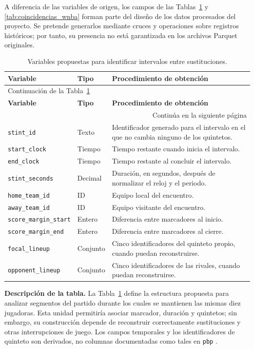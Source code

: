 A diferencia de las variables de origen, los campos de las Tablas~\ref{tab:stints_wnba} y \ref{tab:coincidencias_wnba} forman parte del diseño de los datos procesados del proyecto. Se pretende generarlos mediante cruces y operaciones sobre registros históricos; por tanto, su presencia no está garantizada en los archivos Parquet originales.

{\small
\renewcommand{\arraystretch}{1.15}
\begin{longtable}{@{}p{3.8cm}p{1.7cm}p{6.9cm}@{}}
\caption{Variables propuestas para identificar intervalos entre sustituciones.}\label{tab:stints_wnba}\\
\toprule \textbf{Variable} & \textbf{Tipo} & \textbf{Procedimiento de obtención}\\\midrule\endfirsthead
\multicolumn{3}{l}{\small Continuación de la Tabla~\ref{tab:stints_wnba}}\\
\toprule\textbf{Variable}&\textbf{Tipo}&\textbf{Procedimiento de obtención}\\\midrule\endhead
\midrule\multicolumn{3}{r}{\small Continúa en la siguiente página}\\\endfoot
\bottomrule\endlastfoot
\texttt{stint\_id}&Texto&Identificador generado para el intervalo en el que no cambia ninguno de los quintetos.\\
\texttt{start\_clock}&Tiempo&Tiempo restante cuando inicia el intervalo.\\
\texttt{end\_clock}&Tiempo&Tiempo restante al concluir el intervalo.\\
\texttt{stint\_seconds}&Decimal&Duración, en segundos, después de normalizar el reloj y el periodo.\\
\texttt{home\_team\_id}&ID&Equipo local del encuentro.\\
\texttt{away\_team\_id}&ID&Equipo visitante del encuentro.\\
\texttt{score\_margin\_start}&Entero&Diferencia entre marcadores al inicio.\\
\texttt{score\_margin\_end}&Entero&Diferencia entre marcadores al cierre.\\
\texttt{focal\_lineup}&Conjunto&Cinco identificadores del quinteto propio, cuando puedan reconstruirse.\\
\texttt{opponent\_lineup}&Conjunto&Cinco identificadores de las rivales, cuando puedan reconstruirse.\\
\end{longtable}
}

\noindent\textbf{Descripción de la tabla.}
La Tabla~\ref{tab:stints_wnba} define la estructura propuesta para analizar segmentos del partido durante los cuales se mantienen las mismas diez jugadoras. Esta unidad permitiría asociar marcador, duración y quintetos; sin embargo, su construcción depende de reconstruir correctamente sustituciones y otras interrupciones de juego. Los campos temporales y los identificadores de quinteto son derivados, no columnas documentadas como tales en \texttt{pbp} \cite{wehoopPbp}.

